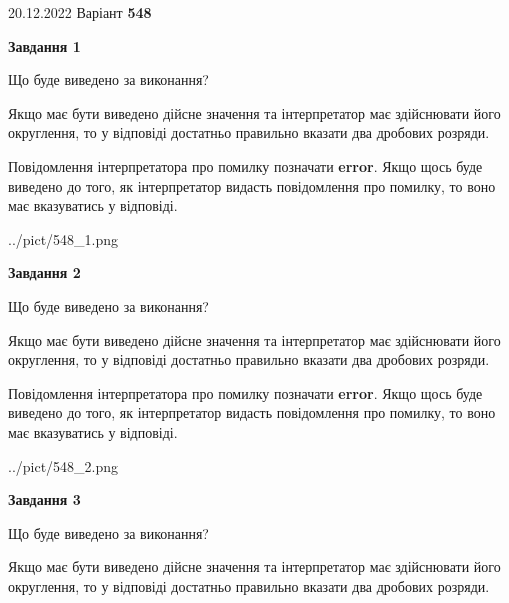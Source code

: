 \documentclass[12pt, ukrainian]{article}
\begin{document}
{20.12.2022 Варіант \No \textbf { 548 }\par}
{
\begin {Large}

{\begin {center}\textbf{Завдання 1}\end {center}}\par
Що буде виведено за виконання? \par

Якщо має бути виведено дійсне значення та інтерпретатор має здійснювати його округлення, 
то у відповіді достатньо правильно вказати два дробових розряди.

Повідомлення інтерпретатора про помилку позначати \textbf{error}.
Якщо щось буде виведено до того, як інтерпретатор видасть повідомлення про помилку, 
то воно має вказуватись у відповіді. \par

\begin{center}
	{../pict/548_1.png}
\end{center}
\newpage

{\begin {center}\textbf{Завдання 2}\end {center}}\par
Що буде виведено за виконання? \par

Якщо має бути виведено дійсне значення та інтерпретатор має здійснювати його округлення, 
то у відповіді достатньо правильно вказати два дробових розряди.

Повідомлення інтерпретатора про помилку позначати \textbf{error}.
Якщо щось буде виведено до того, як інтерпретатор видасть повідомлення про помилку, 
то воно має вказуватись у відповіді. \par

\begin{center}
	{../pict/548_2.png}
\end{center}
\newpage

{\begin {center}\textbf{Завдання 3}\end {center}}\par
Що буде виведено за виконання? \par

Якщо має бути виведено дійсне значення та інтерпретатор має здійснювати його округлення, 
то у відповіді достатньо правильно вказати два дробових розряди.


\end{Large}}
\end{document}
